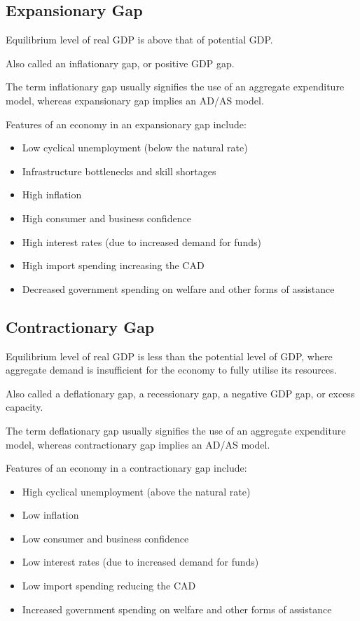 \documentclass[a4paper,11pt]{report}
\begin{document}
\subsection{Expansionary Gap}

Equilibrium level of real GDP is above that of potential GDP.

Also called an inflationary gap, or positive GDP gap.

The term inflationary gap usually signifies the use of an aggregate expenditure
model, whereas expansionary gap implies an AD/AS model.

Features of an economy in an expansionary gap include:

\begin{itemize}
\item Low cyclical unemployment (below the natural rate)
\item Infrastructure bottlenecks and skill shortages
\item High inflation
\item High consumer and business confidence
\item High interest rates (due to increased demand for funds)
\item High import spending increasing the CAD
\item Decreased government spending on welfare and other forms of assistance
\end{itemize}

\subsection{Contractionary Gap}

Equilibrium level of real GDP is less than the potential level of GDP, where
aggregate demand is insufficient for the economy to fully utilise its resources.

Also called a deflationary gap, a recessionary gap, a negative GDP gap, or
excess capacity.

The term deflationary gap usually signifies the use of an aggregate expenditure
model, whereas contractionary gap implies an AD/AS model.

Features of an economy in a contractionary gap include:

\begin{itemize}
\item High cyclical unemployment (above the natural rate)
\item Low inflation
\item Low consumer and business confidence
\item Low interest rates (due to increased demand for funds)
\item Low import spending reducing the CAD
\item Increased government spending on welfare and other forms of assistance
\end{itemize}
\end{document}
